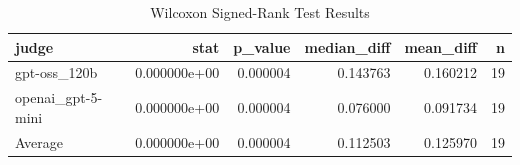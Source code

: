\begin{table}
\caption{Wilcoxon Signed-Rank Test Results}
\label{tab:wilcoxon}
\begin{tabular}{lrrrrr}
\toprule
judge & stat & p_value & median_diff & mean_diff & n \\
\midrule
gpt-oss_120b & 0.000000e+00 & 0.000004 & 0.143763 & 0.160212 & 19 \\
openai_gpt-5-mini & 0.000000e+00 & 0.000004 & 0.076000 & 0.091734 & 19 \\
Average & 0.000000e+00 & 0.000004 & 0.112503 & 0.125970 & 19 \\
\bottomrule
\end{tabular}
\end{table}
